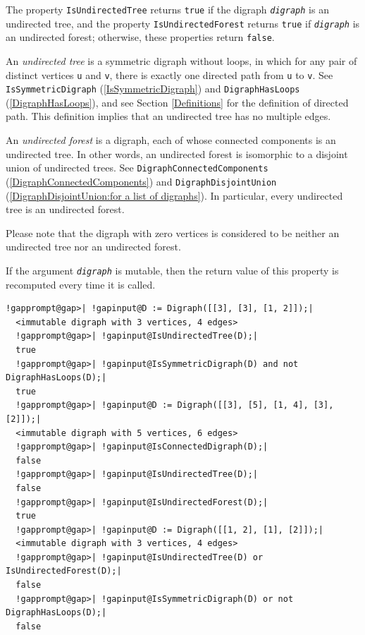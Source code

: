 \documentclass[a4paper,11pt]{report}
\begin{document}
{{{ The property \texttt{IsUndirectedTree} returns \texttt{true} if the digraph \mbox{\texttt{\mdseries\slshape digraph}} is an undirected tree, and the property \texttt{IsUndirectedForest} returns \texttt{true} if \mbox{\texttt{\mdseries\slshape digraph}} is an undirected forest; otherwise, these properties return \texttt{false}. 

 An \emph{undirected tree} is a symmetric digraph without loops, in which for any pair of distinct
vertices \texttt{u} and \texttt{v}, there is exactly one directed path from \texttt{u} to \texttt{v}. See \texttt{IsSymmetricDigraph} (\ref{IsSymmetricDigraph}) and \texttt{DigraphHasLoops} (\ref{DigraphHasLoops}), and see Section \ref{Definitions} for the definition of directed path. This definition implies that an
undirected tree has no multiple edges. 

 An \emph{undirected forest} is a digraph, each of whose connected components is an undirected tree. In
other words, an undirected forest is isomorphic to a disjoint union of
undirected trees. See \texttt{DigraphConnectedComponents} (\ref{DigraphConnectedComponents}) and \texttt{DigraphDisjointUnion} (\ref{DigraphDisjointUnion:for a list of digraphs}). In particular, every undirected tree is an undirected forest. 

 Please note that the digraph with zero vertices is considered to be neither an
undirected tree nor an undirected forest. 

 If the argument \mbox{\texttt{\mdseries\slshape digraph}} is mutable, then the return value of this property is recomputed every time it
is called.

 
\begin{Verbatim}[commandchars=!@|,fontsize=\small,frame=single,label=Example]
  !gapprompt@gap>| !gapinput@D := Digraph([[3], [3], [1, 2]]);|
  <immutable digraph with 3 vertices, 4 edges>
  !gapprompt@gap>| !gapinput@IsUndirectedTree(D);|
  true
  !gapprompt@gap>| !gapinput@IsSymmetricDigraph(D) and not DigraphHasLoops(D);|
  true
  !gapprompt@gap>| !gapinput@D := Digraph([[3], [5], [1, 4], [3], [2]]);|
  <immutable digraph with 5 vertices, 6 edges>
  !gapprompt@gap>| !gapinput@IsConnectedDigraph(D);|
  false
  !gapprompt@gap>| !gapinput@IsUndirectedTree(D);|
  false
  !gapprompt@gap>| !gapinput@IsUndirectedForest(D);|
  true
  !gapprompt@gap>| !gapinput@D := Digraph([[1, 2], [1], [2]]);|
  <immutable digraph with 3 vertices, 4 edges>
  !gapprompt@gap>| !gapinput@IsUndirectedTree(D) or IsUndirectedForest(D);|
  false
  !gapprompt@gap>| !gapinput@IsSymmetricDigraph(D) or not DigraphHasLoops(D);|
  false
\end{Verbatim}
 }

}}
\end{document}
